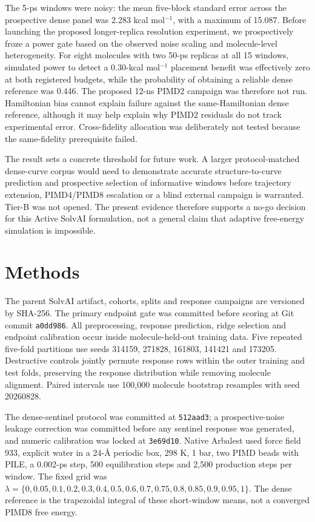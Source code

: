 \documentclass[11pt]{article}
\begin{document}
The 5-ps windows were noisy: the mean five-block standard error across the prospective dense panel was 2.283 kcal mol$^{-1}$, with a maximum of 15.087. Before launching the proposed longer-replica resolution experiment, we prospectively froze a power gate based on the observed noise scaling and molecule-level heterogeneity. For eight molecules with two 50-ps replicas at all 15 windows, simulated power to detect a 0.30-kcal mol$^{-1}$ placement benefit was effectively zero at both registered budgets, while the probability of obtaining a reliable dense reference was 0.446. The proposed 12-ns PIMD2 campaign was therefore not run. Hamiltonian bias cannot explain failure against the same-Hamiltonian dense reference, although it may help explain why PIMD2 residuals do not track experimental error. Cross-fidelity allocation was deliberately not tested because the same-fidelity prerequisite failed.

The result sets a concrete threshold for future work. A larger protocol-matched dense-curve corpus would need to demonstrate accurate structure-to-curve prediction and prospective selection of informative windows before trajectory extension, PIMD4/PIMD8 escalation or a blind external campaign is warranted. Tier-B was not opened. The present evidence therefore supports a no-go decision for this Active SolvAI formulation, not a general claim that adaptive free-energy simulation is impossible.

\section{Methods}
The parent SolvAI artifact, cohorts, splits and response campaigns are versioned by SHA-256. The primary endpoint gate was committed before scoring at Git commit \texttt{a0dd986}. All preprocessing, response prediction, ridge selection and endpoint calibration occur inside molecule-held-out training data. Five repeated five-fold partitions use seeds 314159, 271828, 161803, 141421 and 173205. Destructive controls jointly permute response rows within the outer training and test folds, preserving the response distribution while removing molecule alignment. Paired intervals use 100,000 molecule bootstrap resamples with seed 20260828.

The dense-sentinel protocol was committed at \texttt{512aad3}; a prospective-noise leakage correction was committed before any sentinel response was generated, and numeric calibration was locked at \texttt{3e69d10}. Native Arbalest used force field 933, explicit water in a 24-\AA{} periodic box, 298 K, 1 bar, two PIMD beads with PILE, a 0.002-ps step, 500 equilibration steps and 2,500 production steps per window. The fixed grid was $\lambda=\{0,0.05,0.1,0.2,0.3,0.4,0.5,0.6,0.7,0.75,0.8,0.85,0.9,0.95,1\}$. The dense reference is the trapezoidal integral of these short-window means, not a converged PIMD8 free energy.
\end{document}
